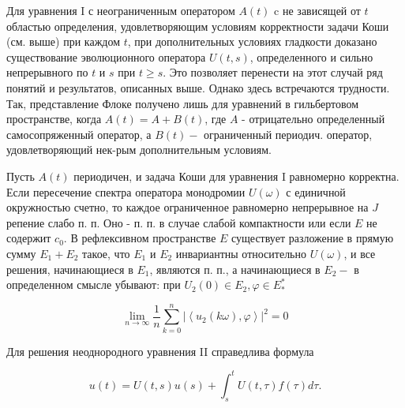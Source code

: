 \documentclass[10pt]{article}
\begin{document}
Для уравнения I с неограниченным оператором $A(t)$ c не зависящей от $t$ областью определения, удовлетворяющим условиям корректности задачи Коши (см. выше) при каждом $t$, при дополнительных условиях гладкости доказано существование эволюционного оператора $U(t, s)$, определенного и сильно непрерывного по $t$ и $s$ при $t \geqslant s$. Это позволяет перенести на этот случай ряд понятий и результатов, описанных выше. Однако здесь встречаются трудности. Так, представление Флоке получено лишь для уравнений в гильбертовом пространстве, когда $A(t)=A+B(t)$, где $A$ - отрицательно определенный самосопряженный оператор, а $B(t)-$ ограниченный периодич. оператор, удовлетворяющий нек-рым дополнительным условиям.



Пусть $A(t)$ периодичен, и задача Коши для уравнения I равномерно корректна. Если пересечение спектра оператора монодромии $U(\omega)$ с единичной окружностью счетно, то каждое ограниченное равномерно непрерывное на $J$ репение слабо п. п. Оно - п. п. в случае слабой компактности или если $E$ не содержит $c_{0}$. В рефлексивном пространстве $E$ существует разложение в прямую сумму $E_{1}+E_{2}$ такое, что $E_{1}$ и $E_{2}$ инвариантны относительно $U(\omega)$, и все решения, начинающиеся в $E_{1}$, являются п. п., а начинающиеся в $E_{2}-$ в определенном смысле убывают: при $U_{2}(0) \in E_{2}, \varphi \in E_{*}^{*}$



\[

\lim _{n \rightarrow \infty} \frac{1}{n} \sum_{k=0}^{n}\left|\left\langle u_{2}(k \omega), \varphi\right\rangle\right|^{2}=0

\]



Для решения неоднородного уравнения II справедлива формула



\[

u(t)=U(t, s) u(s)+\int_{s}^{t} U(t, \tau) f(\tau) d \tau .

\]
\end{document}

